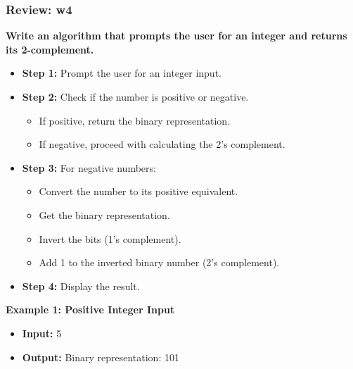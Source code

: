 \documentclass[
	11pt, %
]{beamer}
\begin{document}


\begin{frame}
	\frametitle{Review: w4}

	\textbf{Write an algorithm that prompts the user for an integer and returns its 2-complement.}
 
\begin{itemize}
        \item \textbf{Step 1:} Prompt the user for an integer input.
        \item \textbf{Step 2:} Check if the number is positive or negative.
        \begin{itemize}
            \item If positive, return the binary representation.
            \item If negative, proceed with calculating the 2's complement.
        \end{itemize}
        \item \textbf{Step 3:} For negative numbers:
        \begin{itemize}
            \item Convert the number to its positive equivalent.
            \item Get the binary representation.
            \item Invert the bits (1's complement).
            \item Add 1 to the inverted binary number (2's complement).
        \end{itemize}
        \item \textbf{Step 4:} Display the result.
    \end{itemize}

\textbf{Example 1: Positive Integer Input}
    \begin{itemize}
        \item \textbf{Input:} 5
        \item \textbf{Output:} Binary representation: 101
    \end{itemize}

\end{frame}

\end{document}
